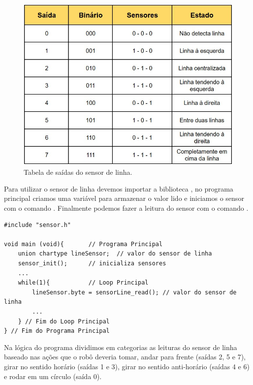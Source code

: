 \documentclass{article}
\begin{document}
\begin{figure}[H]
    \centering
    \includegraphics[width = .8\linewidth]{images/EstadosLinha.jpg}
    \caption{Tabela de saídas do sensor de linha.}
    \label{tab:estadosLinha}
\end{figure}

Para utilizar o sensor de linha devemos importar a biblioteca , no programa principal criamos uma variável  para armazenar o valor lido e iniciamos o sensor com o comando . Finalmente podemos fazer a leitura do sensor com o comando .

\begin{lstlisting}[style = Matlab-editor, language = C2]
#include "sensor.h"

void main (void){       // Programa Principal
    union chartype lineSensor;  // valor do sensor de linha
    sensor_init();      // inicializa sensores
    ...
    while(1){           // Loop Principal
        lineSensor.byte = sensorLine_read(); // valor do sensor de linha
        ...
    } // Fim do Loop Principal
} // Fim do Programa Principal
\end{lstlisting}

Na lógica do programa dividimos em categorias as leituras do sensor de linha baseado nas ações que o robô deveria tomar, andar para frente (saídas 2, 5 e 7), girar no sentido horário (saídas 1 e 3), girar no sentido anti-horário (saídas 4 e 6) e rodar em um círculo (saída 0).
\end{document}
